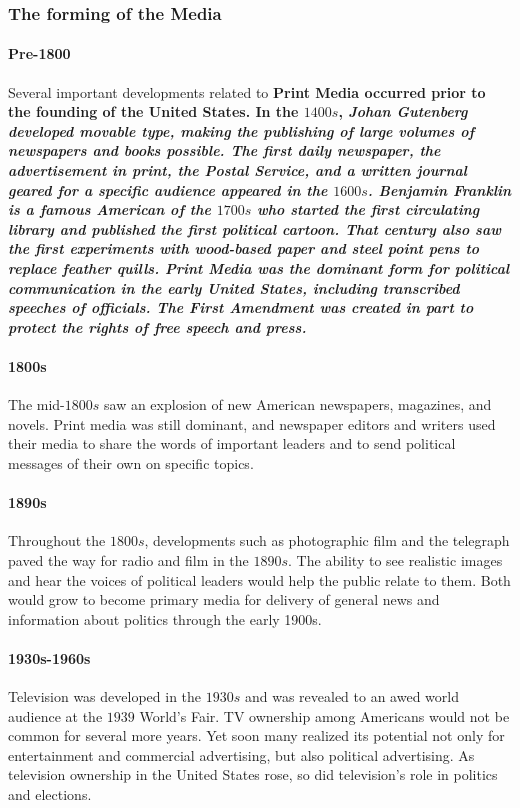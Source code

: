\subsubsection*{The forming of the Media}

\paragraph{Pre-1800} Several important developments related to \bf{Print Media} occurred prior to the founding of the \bf{United States}. In the $1400s$, \it{Johan Gutenberg} developed movable type, making the publishing of large volumes of newspapers and books possible. The first daily newspaper, the advertisement in print, the \bf{Postal Service}, and a written journal geared for a specific audience appeared in the $1600s$. \it{Benjamin Franklin} is a famous American of the $1700s$ who started the first circulating library and published the first political cartoon. That century also saw the first experiments with wood-based paper and steel point pens to replace feather quills. \bf{Print Media} was the dominant form for political communication in the early \bf{United States}, including transcribed speeches of officials. The \it{First Amendment} was created in part to protect the rights of free speech and press.

\paragraph{1800s} The mid-$1800s$ saw an explosion of new American newspapers, magazines, and novels. Print media was still dominant, and newspaper editors and writers used their media to share the words of important leaders and to send political messages of their own on specific topics.

\paragraph{1890s} Throughout the $1800s$, developments such as photographic film and the telegraph paved the way for radio and film in the $1890s$. The ability to see realistic images and hear the voices of political leaders would help the public relate to them. Both would grow to become primary media for delivery of general news and information about politics through the early 1900s.

\paragraph{1930s-1960s} Television was developed in the $1930s$ and was revealed to an awed world audience at the $1939$ World's Fair. TV ownership among Americans would not be common for several more years. Yet soon many realized its potential not only for entertainment and commercial advertising, but also political advertising. As television ownership in the United States rose, so did television's role in politics and elections.

